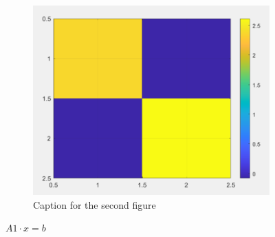 \documentclass{article}
\begin{document}
\begin{figure}[hbt!]
\begin{subfigure}{0.45\linewidth}
            \includegraphics[width=\linewidth]{img/mat4.png}
            \caption{Caption for the second figure}
        \end{subfigure}

        \caption{$A1 \cdot x = b$}
        \label{fig:example4}
    \end{figure}
    
    \newpage
\end{document}
